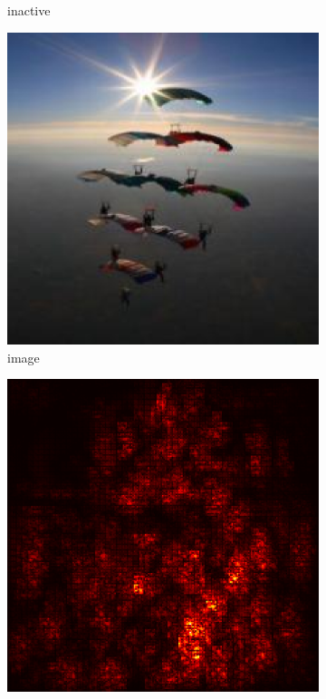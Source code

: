 \documentclass[preprint,12pt]{elsarticle}
\begin{document}
\begin{figure}
\begin{subfigure}{0.14\textwidth}
        \caption{inactive}
    \end{subfigure}
    \hfill
    \begin{subfigure}{0.14\linewidth}
        \centering
        \includegraphics[width=\linewidth]{../visualizations/examples/imagenette/cnn/images/8.png}
        \caption{image}
    \end{subfigure}
    \hfill
    \begin{subfigure}{0.14\linewidth}
        \centering
        \includegraphics[width=\linewidth]{../visualizations/examples/imagenette/cnn/saliency_map/8.png}

\end{subfigure}
\end{figure}
\end{document}
